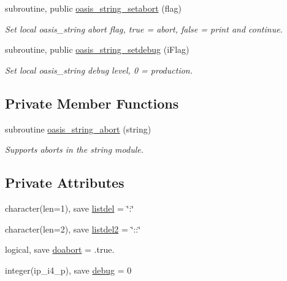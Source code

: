 \begin{DoxyCompactItemize}
subroutine, public \hyperlink{classmod__oasis__string_a10977c4902f912074ef3effd86630a24}{oasis\+\_\+string\+\_\+setabort} (flag)
\begin{DoxyCompactList}\small\item\em Set local oasis\+\_\+string abort flag, true = abort, false = print and continue. \end{DoxyCompactList}\item 
subroutine, public \hyperlink{classmod__oasis__string_af5c49843654a2bc9ccedf2934571329d}{oasis\+\_\+string\+\_\+setdebug} (i\+Flag)
\begin{DoxyCompactList}\small\item\em Set local oasis\+\_\+string debug level, 0 = production. \end{DoxyCompactList}\end{DoxyCompactItemize}
\subsection*{Private Member Functions}
\begin{DoxyCompactItemize}
\item 
subroutine \hyperlink{classmod__oasis__string_a86c2c26b793c41219bc833beb992d0e3}{oasis\+\_\+string\+\_\+abort} (string)
\begin{DoxyCompactList}\small\item\em Supports aborts in the string module. \end{DoxyCompactList}\end{DoxyCompactItemize}
\subsection*{Private Attributes}
\begin{DoxyCompactItemize}
\item 
character(len=1), save \hyperlink{classmod__oasis__string_aa6f905efb4869a52d8bb2414e82bb0a7}{listdel} = \char`\"{}\+:\char`\"{}
\item 
character(len=2), save \hyperlink{classmod__oasis__string_a9b40ad6f4785bd4765a24b6337185513}{listdel2} = \char`\"{}\+::\char`\"{}
\item 
logical, save \hyperlink{classmod__oasis__string_a59e9b1145c7c14506941e6495b237395}{doabort} = .true.
\item 
integer(ip\+\_\+i4\+\_\+p), save \hyperlink{classmod__oasis__string_a84408befb8bedabf75507eb4d690cea9}{debug} = 0
\end{DoxyCompactItemize}


